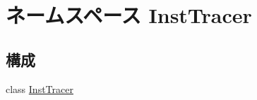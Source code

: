 \hypertarget{namespaceInstTracer}{
\section{ネームスペース InstTracer}
\label{namespaceInstTracer}
}
\subsection*{構成}
\begin{DoxyCompactItemize}
\item 
class \hyperlink{classInstTracer_1_1InstTracer}{InstTracer}
\end{DoxyCompactItemize}
